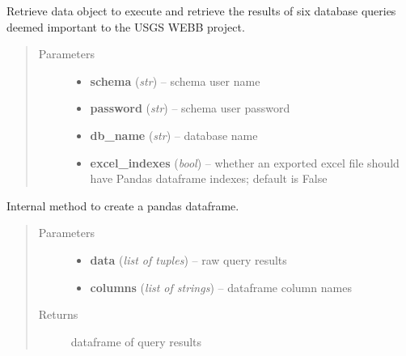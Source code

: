\documentclass[letterpaper,10pt,english]{sphinxmanual}
\begin{document}
\begin{fulllineitems}
\label{modules:webb_utils.retrieve_data.RetrieveData}
Retrieve data object to execute and retrieve the results
of six database queries deemed important to the USGS WEBB
project.
\begin{quote}\begin{description}
\item[{Parameters}] \leavevmode\begin{itemize}
\item {} 
\textbf{schema} (\emph{str}) -- schema user name

\item {} 
\textbf{password} (\emph{str}) -- schema user password

\item {} 
\textbf{db\_name} (\emph{str}) -- database name

\item {} 
\textbf{excel\_indexes} (\emph{bool}) -- whether an exported excel file should have Pandas dataframe indexes; default is False

\end{itemize}

\end{description}\end{quote}

\begin{fulllineitems}
\label{modules:webb_utils.retrieve_data.RetrieveData._create_dataframe}
Internal method to create a pandas dataframe.
\begin{quote}\begin{description}
\item[{Parameters}] \leavevmode\begin{itemize}
\item {} 
\textbf{data} (\emph{list of tuples}) -- raw query results

\item {} 
\textbf{columns} (\emph{list of strings}) -- dataframe column names

\end{itemize}

\item[{Returns}] \leavevmode
dataframe of query results


\end{description}
\end{quote}
\end{fulllineitems}
\end{fulllineitems}
\end{document}
